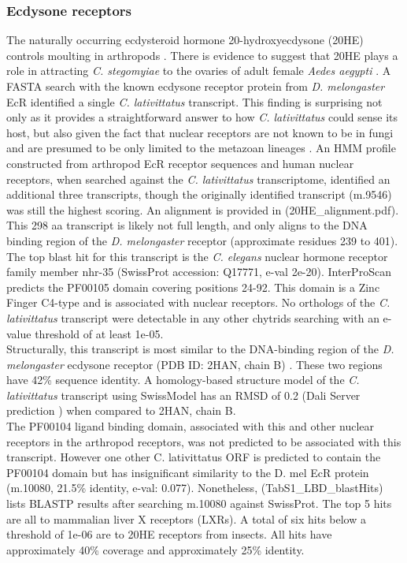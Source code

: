 \subsubsection*{Ecdysone receptors}
The naturally occurring ecdysteroid hormone 20-hydroxyecdysone (20HE) controls moulting in arthropods \cite{Thummel2002}. There is evidence to suggest that 20HE plays a role in attracting \textit{C. stegomyiae} to the ovaries of adult female \textit{Aedes aegypti} \cite{Lucarotti1992}. A FASTA search with the known ecdysone receptor protein from \textit{D. melongaster} EcR \cite{Koelle1991} identified a single \textit{C. lativittatus} transcript. This finding is surprising not only as it provides a straightforward answer to how \textit{C. lativittatus} could sense its host, but also given the fact that nuclear receptors are not known to be in fungi and are presumed to be only limited to the metazoan lineages \cite{Escriva1998}. An HMM profile constructed from arthropod EcR receptor sequences and human nuclear receptors, when searched against the \textit{C. lativittatus} transcriptome, identified an additional three transcripts, though the originally identified transcript (m.9546) was still the highest scoring. An alignment is provided in (20HE\_alignment.pdf).\\
\indent This 298 aa transcript is likely not full length, and only aligns to the DNA binding region of the \textit{D. melongaster} receptor (approximate residues 239 to 401). The top blast hit for this transcript is the \textit{C. elegans} nuclear hormone receptor family member nhr-35 (SwissProt accession: Q17771, e-val 2e-20). InterProScan \cite{Jones2014} predicts the PF00105 domain covering positions 24-92. This domain is a Zinc Finger C4-type and is associated with nuclear receptors. No orthologs of the \textit{C. lativittatus} transcript were detectable in any other chytrids searching with an e-value threshold of at least 1e-05. \\
\indent Structurally, this transcript is most similar to the DNA-binding region of the \textit{D. melongaster} ecdysone receptor (PDB ID: 2HAN, chain B) \cite{Jakob2007}. These two regions have 42\% sequence identity. A homology-based structure model of the \textit{C. lativittatus} transcript using SwissModel \cite{Arnold2006} has an RMSD of 0.2 (Dali Server prediction \cite{Holm2010}) when compared to 2HAN, chain B. \\
\indent The PF00104 ligand binding domain, associated with this and other nuclear receptors in the arthropod receptors, was not predicted to be associated with this transcript. However one other C. lativittatus ORF is predicted to contain the PF00104 domain but has insignificant similarity to the D. mel EcR protein (m.10080, 21.5\% identity, e-val: 0.077). Nonetheless, (TabS1\_LBD\_blastHits) lists BLASTP results after searching m.10080 against SwissProt. The top 5 hits are all to mammalian liver X receptors (LXRs). A total of six hits below a threshold of 1e-06 are to 20HE receptors from insects. All hits have approximately 40\% coverage and approximately 25\% identity. \\
